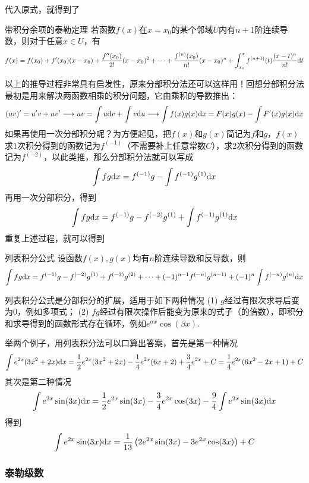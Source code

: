 \documentclass[main.tex]{subfiles}
\begin{document}
代入原式，就得到了
\begin{theorem}{带积分余项的泰勒定理}
    若函数\(f(x)\)在\(x=x_0\)的某个邻域\(U\)内有\(n+1\)阶连续导数，则对于任意\(x\in U\)，有
    \[f(x)=f(x_0)+f'(x_0)(x-x_0)+\frac{f''(x_0)}{2!}(x-x_0)^2+\cdots+\frac{f^{(n)}(x_0)}{n!}(x-x_0)^n+\int_{x_0}^{x}f^{(n+1)}(t)\frac{(x-t)^{n}}{n!}{\rm d}t\]
\end{theorem}

以上的推导过程非常具有启发性，原来分部积分法还可以这样用！回想分部积分法最初是用来解决两函数相乘的积分问题，它由乘积的导数推出：
\[(uv)'=u'v+uv' \longrightarrow uv = \int u{\rm d}v+\int v{\rm d}u  \longrightarrow \int f(x)g(x){\rm d}x = F(x)g(x)-\int F'(x)g(x){\rm d}x\]
如果再使用一次分部积分呢？为方便起见，把\(f(x)\)和\(g(x)\)简记为\(f\)和\(g\)，\(f(x)\)求\(1\)次积分得到的函数记为\(f^{(-1)}\)（不需要补上任意常数\(C\)），求\(2\)次积分得到的函数记为\(f^{(-2)}\)，以此类推，那么分部积分法就可以写成
\[\int fg{\rm d}x=f^{(-1)}g-\int f^{(-1)}g^{(1)} {\rm d}x\]
再用一次分部积分，得到
\[\int fg{\rm d}x=f^{(-1)}g-f^{(-2)}g^{(1)}+\int f^{(-1)}g^{(1)} {\rm d}x\]
重复上述过程，就可以得到
\begin{theorem}{列表积分公式}
    设函数\(f(x),g(x)\)均有\(n\)阶连续导数和反导数，则
    \[\int fg{\rm d}x=f^{(-1)}g-f^{(-2)}g^{(1)}+f^{(-3)}g^{(2)}+\cdots+(-1)^{n-1}f^{(-n)}g^{(n-1)}+(-1)^n\int f^{(-n)}g^{(n)} {\rm d}x\]
\end{theorem}

列表积分公式是分部积分的扩展，适用于如下两种情况
\newline
(1) \(g\)经过有限次求导后变为\(0\)，例如多项式；\newline
(2) \(fg\)经过有限次操作后能变为原来的式子（的倍数），即积分和求导得到的函数形式存在循环，例如\(e^{\alpha x}\cos(\beta x)\).

举两个例子，用列表积分法可以口算出答案，首先是第一种情况
\[\int e^{2x}(3x^2+2x){\rm d}x = \frac{1}{2}e^{2x}(3x^2+2x)-\frac{1}{4}e^{2x}(6x+2)+\frac{3}{4}e^{2x}+C=\frac{1}{4}e^{2x}(6x^2-2x+1)+C\]
其次是第二种情况
\[\int e^{2x}\sin(3x){\rm d}x = \frac{1}{2}e^{2x}\sin(3x)-\frac{3}{4}e^{2x}\cos(3x)-\frac{9}{4}\int e^{2x}\sin(3x){\rm d}x\]
得到
\[\int e^{2x}\sin(3x){\rm d}x = \frac{1}{13}\left(2e^{2x}\sin(3x)-3e^{2x}\cos(3x)\right)+C\]

\subsubsection{泰勒级数}
\end{document}
